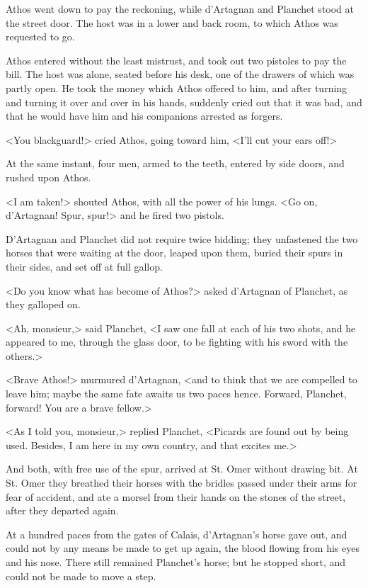 Athos went down to pay the reckoning, while d'Artagnan and Planchet stood at the street door. The host was in a lower and back room, to which Athos was requested to go. 

Athos entered without the least mistrust, and took out two pistoles to pay the bill. The host was alone, seated before his desk, one of the drawers of which was partly open. He took the money which Athos offered to him, and after turning and turning it over and over in his hands, suddenly cried out that it was bad, and that he would have him and his companions arrested as forgers. 

<You blackguard!> cried Athos, going toward him, <I'll cut your ears off!> 

At the same instant, four men, armed to the teeth, entered by side doors, and rushed upon Athos. 

<I am taken!> shouted Athos, with all the power of his lungs. <Go on, d'Artagnan! Spur, spur!> and he fired two pistols. 

D'Artagnan and Planchet did not require twice bidding; they unfastened the two horses that were waiting at the door, leaped upon them, buried their spurs in their sides, and set off at full gallop. 

<Do you know what has become of Athos?> asked d'Artagnan of Planchet, as they galloped on. 

<Ah, monsieur,> said Planchet, <I saw one fall at each of his two shots, and he appeared to me, through the glass door, to be fighting with his sword with the others.> 

<Brave Athos!> murmured d'Artagnan, <and to think that we are compelled to leave him; maybe the same fate awaits us two paces hence. Forward, Planchet, forward! You are a brave fellow.> 

<As I told you, monsieur,> replied Planchet, <Picards are found out by being used. Besides, I am here in my own country, and that excites me.> 

And both, with free use of the spur, arrived at St. Omer without drawing bit. At St. Omer they breathed their horses with the bridles passed under their arms for fear of accident, and ate a morsel from their hands on the stones of the street, after they departed again. 

At a hundred paces from the gates of Calais, d'Artagnan's horse gave out, and could not by any means be made to get up again, the blood flowing from his eyes and his nose. There still remained Planchet's horse; but he stopped short, and could not be made to move a step. 

